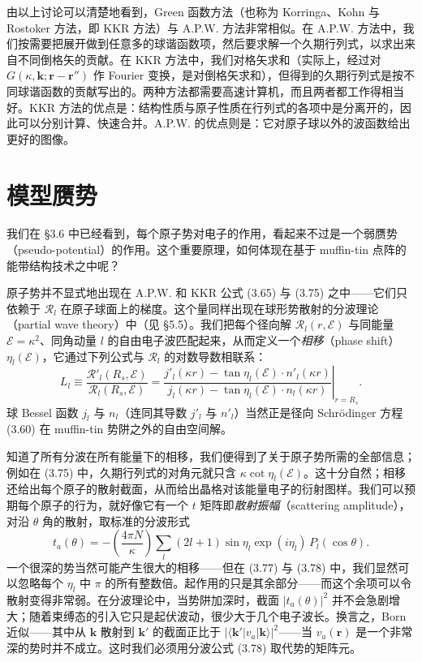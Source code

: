 由以上讨论可以清楚地看到，Green 函数方法（也称为 Korringa、Kohn 与 Rostoker 方法，即 KKR 方法）与 A.P.W. 方法非常相似。在 A.P.W. 方法中，我们按需要把展开做到任意多的球谐函数项，然后要求解一个久期行列式，以求出来自不同倒格矢的贡献。在 KKR 方法中，我们对格矢求和（实际上，经过对 $G(\kappa,\mathbf{k};\mathbf{r}-\mathbf{r}'')$ 作 Fourier 变换，是对倒格矢求和），但得到的久期行列式是按不同球谐函数的贡献写出的。两种方法都需要高速计算机，而且两者都工作得相当好。KKR 方法的优点是：结构性质与原子性质在行列式的各项中是分离开的，因此可以分别计算、快速合并。A.P.W. 的优点则是：它对原子球以外的波函数给出更好的图像。

\section{模型赝势}

我们在 §3.6 中已经看到，每个原子势对电子的作用，看起来不过是一个弱赝势（pseudo-potential）的作用。这个重要原理，如何体现在基于 muffin-tin 点阵的能带结构技术之中呢？

原子势并不显式地出现在 A.P.W. 和 KKR 公式 (3.65) 与 (3.75) 之中——它们只依赖于 $\mathcal{R}_l$ 在原子球面上的梯度。这个量同样出现在球形势散射的分波理论（partial wave theory）中（见 §5.5）。我们把每个径向解 $\mathcal{R}_l(r,\mathcal{E})$ 与同能量 $\mathcal{E}=\kappa^2$、同角动量 $l$ 的自由电子波匹配起来，从而定义一个\emph{相移}（phase shift）$\eta_l(\mathcal{E})$，它通过下列公式与 $\mathcal{R}_l$ 的对数导数相联系：
\begin{equation*}
L_l\equiv\frac{\mathcal{R}'_l(R_s,\mathcal{E})}{\mathcal{R}_l(R_s,\mathcal{E})}=\left.\frac{j'_l(\kappa r)-\tan\eta_l(\mathcal{E})\cdot n'_l(\kappa r)}{j_l(\kappa r)-\tan\eta_l(\mathcal{E})\cdot n_l(\kappa r)}\right|_{r=R_s}.\tag{3.77}
\end{equation*}
球 Bessel 函数 $j_l$ 与 $n_l$（连同其导数 $j'_l$ 与 $n'_l$）当然正是径向 Schrödinger 方程 (3.60) 在 muffin-tin 势阱之外的自由空间解。

知道了所有分波在所有能量下的相移，我们便得到了关于原子势所需的全部信息；例如在 (3.75) 中，久期行列式的对角元就只含 $\kappa\cot\eta_l(\mathcal{E})$。这十分自然；相移还给出每个原子的散射截面，从而给出晶格对该能量电子的衍射图样。我们可以预期每个原子的行为，就好像它有一个 $t$ 矩阵即\emph{散射振幅}（scattering amplitude），对沿 $\theta$ 角的散射，取标准的分波形式
\begin{equation*}
t_a(\theta)=-\left(\frac{4\pi N}{\kappa}\right)\sum_l(2l+1)\sin\eta_l\exp(i\eta_l)\,P_l(\cos\theta).\tag{3.78}
\end{equation*}
一个很深的势当然可能产生很大的相移——但在 (3.77) 与 (3.78) 中，我们显然可以忽略每个 $\eta_l$ 中 $\pi$ 的所有整数倍。起作用的只是其余部分——而这个余项可以令散射变得非常弱。在分波理论中，当势阱加深时，截面 $|t_a(\theta)|^2$ 并不会急剧增大；随着束缚态的引入它只是起伏波动，很少大于几个电子波长。换言之，Born 近似——其中从 $\mathbf{k}$ 散射到 $\mathbf{k}'$ 的截面正比于 $|\langle\mathbf{k}'|v_a|\mathbf{k}\rangle|^2$——当 $v_a(\mathbf{r})$ 是一个非常深的势时并不成立。这时我们必须用分波公式 (3.78) 取代势的矩阵元。

